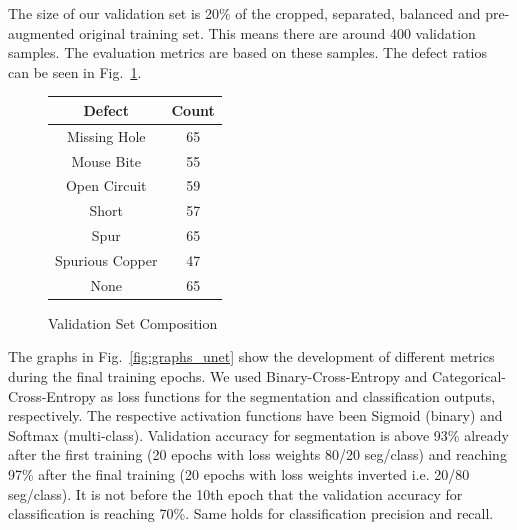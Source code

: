 \documentclass[12pt]{article}
\begin{document}
The size of our validation set is 20\% of the cropped, separated, balanced and pre-augmented original training set. This means there are around 400 validation samples. The evaluation metrics are based on these samples. The defect ratios can be seen in Fig.~\ref{fig:val_set}.
\begin{figure}[H]
    \begin{center}
        \begin{tabular}{|c|c|}
            \hline
            Defect & Count\\
            \hline
            Missing Hole & 65 \\
            Mouse Bite & 55 \\
            Open Circuit & 59 \\
            Short & 57 \\
            Spur & 65 \\
            Spurious Copper & 47 \\
            None & 65\\
            \hline
        \end{tabular}
    \end{center}
    \caption{Validation Set Composition}
    \label{fig:val_set}
\end{figure}

The graphs in Fig.~\ref{fig:graphs_unet} show the development of different metrics during the final training epochs. We used Binary-Cross-Entropy and Categorical-Cross-Entropy as loss functions for the segmentation and classification outputs, respectively. The respective activation functions have been Sigmoid (binary) and Softmax (multi-class). Validation accuracy for segmentation is above 93\% already after the first training (20 epochs with loss weights 80/20 seg/class) and reaching 97\% after the final training (20 epochs with loss weights inverted i.e. 20/80 seg/class). It is not before the 10th epoch that the validation accuracy for classification is reaching 70\%. Same holds for classification precision and recall.
\end{document}
